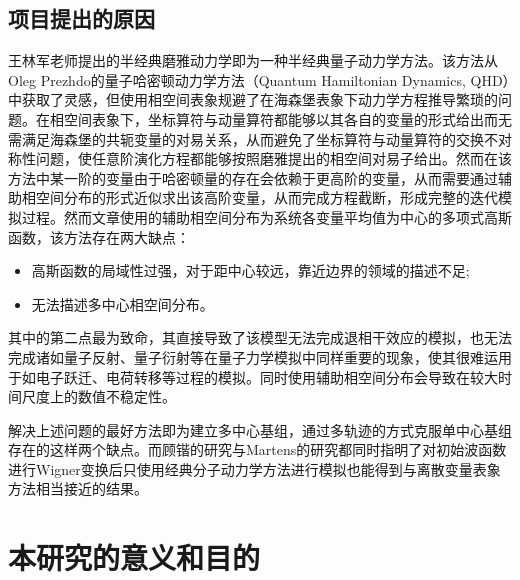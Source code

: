 \subsection{项目提出的原因}
王林军老师提出的半经典磨雅动力学即为一种半经典量子动力学方法\cite{LinjunSemiclassical}。该方法从Oleg Prezhdo的量子哈密顿动力学方法\cite{OlegQHD}（Quantum Hamiltonian Dynamics, QHD）中获取了灵感，但使用相空间表象规避了在海森堡表象下动力学方程推导繁琐的问题。在相空间表象下，坐标算符与动量算符都能够以其各自的变量的形式给出而无需满足海森堡的共轭变量的对易关系\cite{wigner1997quantum}，从而避免了坐标算符与动量算符的交换不对称性问题，使任意阶演化方程都能够按照磨雅提出的相空间对易子\cite{moyal1949quantum}给出。然而在该方法中某一阶的变量由于哈密顿量的存在会依赖于更高阶的变量，从而需要通过辅助相空间分布的形式近似求出该高阶变量，从而完成方程截断，形成完整的迭代模拟过程。然而文章使用的辅助相空间分布为系统各变量平均值为中心的多项式高斯函数，该方法存在两大缺点：
\begin{itemize}
	\item 高斯函数的局域性过强，对于距中心较远，靠近边界的领域的描述不足;
	\item 无法描述多中心相空间分布。
\end{itemize}
其中的第二点最为致命，其直接导致了该模型无法完成退相干效应的模拟，也无法完成诸如量子反射、量子衍射等在量子力学模拟中同样重要的现象，使其很难运用于如电子跃迁、电荷转移等过程的模拟。同时使用辅助相空间分布会导致在较大时间尺度上的数值不稳定性\cite{kaiguPSQHD}。

解决上述问题的最好方法即为建立多中心基组\cite{kaiguPSQHD}，通过多轨迹的方式克服单中心基组存在的这样两个缺点。而顾锴的研究与Martens的研究都同时指明了对初始波函数进行Wigner变换后只使用经典分子动力学方法进行模拟也能得到与离散变量表象方法相当接近的结果\cite{kaiguPSQHD,donoso2000simulation}。
\section{本研究的意义和目的}
